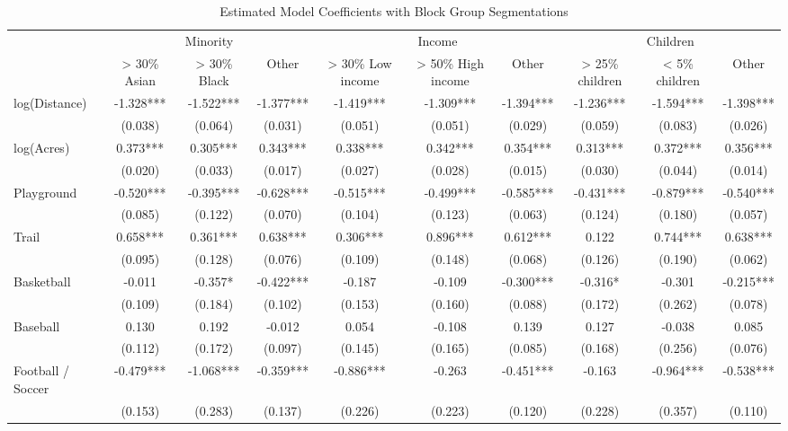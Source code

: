 \documentclass[]{elsarticle} %
\begin{document}
\begin{table}

\caption{\label{tab:grouped-modelsummary}Estimated Model Coefficients with Block Group Segmentations}
\centering
\begin{tabular}[t]{lccccccccc}
\toprule
\multicolumn{1}{c}{ } & \multicolumn{3}{c}{Minority} & \multicolumn{3}{c}{Income} & \multicolumn{3}{c}{Children} \\
\cmidrule(l{3pt}r{3pt}){2-4} \cmidrule(l{3pt}r{3pt}){5-7} \cmidrule(l{3pt}r{3pt}){8-10}
  & > 30\% Asian & > 30\% Black & Other & > 30\% Low income & > 50\% High income & Other  & > 25\% children & < 5\% children & Other  \\
\midrule
log(Distance) & -1.328*** & -1.522*** & -1.377*** & -1.419*** & -1.309*** & -1.394*** & -1.236*** & -1.594*** & -1.398***\\
 & (0.038) & (0.064) & (0.031) & (0.051) & (0.051) & (0.029) & (0.059) & (0.083) & (0.026)\\
log(Acres) & 0.373*** & 0.305*** & 0.343*** & 0.338*** & 0.342*** & 0.354*** & 0.313*** & 0.372*** & 0.356***\\
 & (0.020) & (0.033) & (0.017) & (0.027) & (0.028) & (0.015) & (0.030) & (0.044) & (0.014)\\
Playground & -0.520*** & -0.395*** & -0.628*** & -0.515*** & -0.499*** & -0.585*** & -0.431*** & -0.879*** & -0.540***\\
 & (0.085) & (0.122) & (0.070) & (0.104) & (0.123) & (0.063) & (0.124) & (0.180) & (0.057)\\
Trail & 0.658*** & 0.361*** & 0.638*** & 0.306*** & 0.896*** & 0.612*** & 0.122 & 0.744*** & 0.638***\\
 & (0.095) & (0.128) & (0.076) & (0.109) & (0.148) & (0.068) & (0.126) & (0.190) & (0.062)\\
Basketball & -0.011 & -0.357* & -0.422*** & -0.187 & -0.109 & -0.300*** & -0.316* & -0.301 & -0.215***\\
 & (0.109) & (0.184) & (0.102) & (0.153) & (0.160) & (0.088) & (0.172) & (0.262) & (0.078)\\
Baseball & 0.130 & 0.192 & -0.012 & 0.054 & -0.108 & 0.139 & 0.127 & -0.038 & 0.085\\
 & (0.112) & (0.172) & (0.097) & (0.145) & (0.165) & (0.085) & (0.168) & (0.256) & (0.076)\\
Football / Soccer & -0.479*** & -1.068*** & -0.359*** & -0.886*** & -0.263 & -0.451*** & -0.163 & -0.964*** & -0.538***\\
 & (0.153) & (0.283) & (0.137) & (0.226) & (0.223) & (0.120) & (0.228) & (0.357) & (0.110)\\

\end{tabular}
\end{table}
\end{document}

